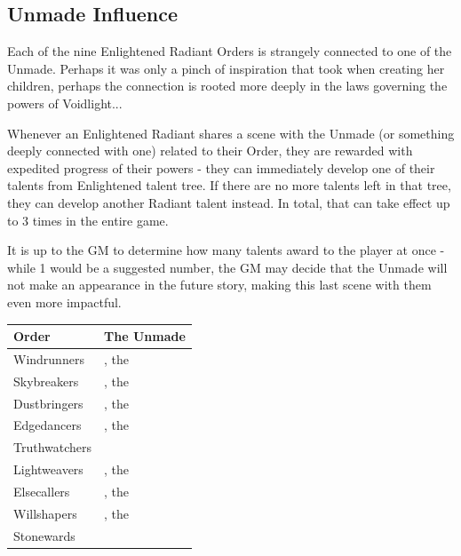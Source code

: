 \subsection{Unmade Influence}

Each of the nine Enlightened Radiant Orders is strangely connected to one of the Unmade. Perhaps it was only a pinch of inspiration that \npcSjaAnat{} took when creating her children, perhaps the connection is rooted more deeply in the laws governing the powers of Voidlight...

Whenever an Enlightened Radiant shares a scene with the Unmade (or something deeply connected with one) related to their Order, they are rewarded with expedited progress of their powers - they can immediately develop one of their talents from Enlightened talent tree. If there are no more talents left in that tree, they can develop another Radiant talent instead. In total, that can take effect up to 3 times in the entire game.

It is up to the GM to determine how many talents award to the player at once - while 1 would be a suggested number, the GM may decide that the Unmade will not make an appearance in the future story, making this last scene with them even more impactful.

\vspace{0.3cm}
\noindent
\begin{tabular}{p{2.5cm} p{6cm}}
	\color{black} Order 			& \color{black} The Unmade 											\\ \hline
	\color{black} Windrunners 		& \color{black} \npcThrill{}, the \npcThrillTitle{} 				\\
	\color{black} Skybreakers 		& \color{black} \npcYeligNar{}, the \npcYeligNarTitle{} 			\\
	\color{black} Dustbringers 		& \color{black} \npcDustmother{}, the \npcDustmotherTitle{} 		\\
	\color{black} Edgedancers 		& \color{black} \npcMidnightMother{}, the \npcMidnightMotherTitle{} \\
	\color{black} Truthwatchers 	& \color{black} \npcMoelach{} 										\\
	\color{black} Lightweavers		& \color{black} \npcSjaAnat{}, the \npcSjaAnatTitle{} 				\\
	\color{black} Elsecallers		& \color{black} \npcBlackFisher{}, the \npcBlackFisherTitle{}		\\
	\color{black} Willshapers 		& \color{black} \npcHeartRevel{}, the \npcHeartRevelTitle{} 		\\
	\color{black} Stonewards		& \color{black} \npcMishram{} 										\\	
\end{tabular}

